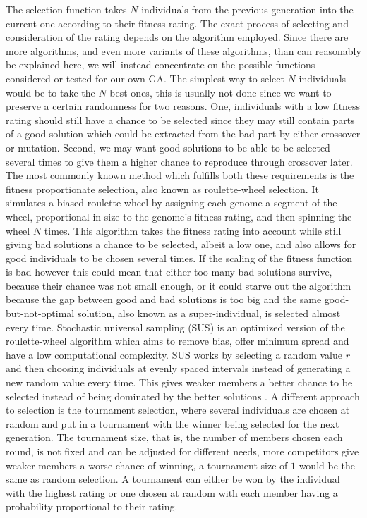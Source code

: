 The selection function takes $N$ individuals from the previous generation into the current one according to their fitness rating. The exact process of selecting and consideration of the rating depends on the algorithm employed. Since there are more algorithms, and even more variants of these algorithms, than can reasonably be explained here, we will instead concentrate on the possible functions considered or tested for our own GA. The simplest way to select $N$ individuals would be to take the $N$ best ones, this is usually not done since we want to preserve a certain randomness for two reasons. One, individuals with a low fitness rating should still have a chance to be selected since they may still contain parts of a good solution which could be extracted from the bad part by either crossover or mutation. Second, we may want good solutions to be able to be selected several times to give them a higher chance to reproduce through crossover later. The most commonly known method which fulfills both these requirements is the fitness proportionate selection\cite{16}, also known as roulette-wheel selection. It simulates a biased roulette wheel by assigning each genome a segment of the wheel, proportional in size to the genome's fitness rating, and then spinning the wheel $N$ times. This algorithm takes the fitness rating into account while still giving bad solutions a chance to be selected, albeit a low one, and also allows for good individuals to be chosen several times.  If the scaling of the fitness function is bad however this could mean that either too many bad solutions survive, because their chance was not small enough, or it could starve out the algorithm because the gap between good and bad solutions is too big and the same good-but-not-optimal solution, also known as a super-individual, is selected almost every time. Stochastic universal sampling (SUS) is an optimized version \cite{16} of the roulette-wheel algorithm which aims to remove bias, offer minimum spread and have a low computational complexity. SUS works by selecting a random value $r$ and then choosing individuals at evenly spaced intervals instead of generating a new random value every time. This gives weaker members a better chance to be selected instead of being dominated by the better solutions \cite{17}. A different approach to selection is the tournament selection, where several individuals are chosen at random and put in a tournament with the winner being selected for the next generation. The tournament size, that is, the number of members chosen each round, is not fixed and can be adjusted for different needs, more competitors give weaker members a worse chance of winning, a tournament size of $1$ would be the same as random selection. A tournament can either be won by the individual with the highest rating or one chosen at random with each member having a probability proportional to their rating.

